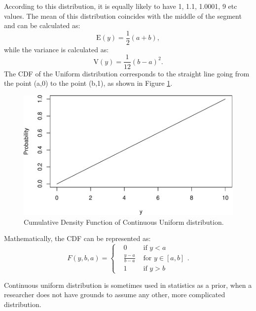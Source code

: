 \documentclass[
]{book}
\theoremstyle{definition}
\theoremstyle{definition}
\theoremstyle{definition}
\theoremstyle{definition}
\theoremstyle{remark}
\begin{document}
According to this distribution, it is equally likely to have 1, 1.1, 1.0001, 9 etc values. The mean of this distribution coincides with the middle of the segment and can be calculated as:
\begin{equation}
    \mathrm{E}(y) = \frac{1}{2}(a+b) ,
    \label{eq:ContinuousUniformPDFMean}
\end{equation}
while the variance is calculated as:
\begin{equation}
    \mathrm{V}(y) = \frac{1}{12}(b-a)^2 .
    \label{eq:ContinuousUniformPDFVariance}
\end{equation}
The CDF of the Uniform distribution corresponds to the straight line going from the point (a,0) to the point (b,1), as shown in Figure \ref{fig:uniformCDFContinuous}.

\begin{figure}
\centering
\includegraphics{Svetunkov---Statistics-for-Business-Analytics_files/figure-latex/uniformCDFContinuous-1.pdf}
\caption{\label{fig:uniformCDFContinuous}Cumulative Density Function of Continuous Uniform distribution.}
\end{figure}

Mathematically, the CDF can be represented as:
\begin{equation}
    F(y, b, a) = \left\{\begin{aligned}
                        & 0 & \text{ if } y<a \\
                        & \frac{y-a}{b-a} & \text{ for } y \in [a, b] \\
                        & 1 & \text{ if } y>b
                    \end{aligned} \right. .
    \label{eq:ContinuousUniformCDF}
\end{equation}

Continuous uniform distribution is sometimes used in statistics as a prior, when a researcher does not have grounds to assume any other, more complicated distribution.
\end{document}
